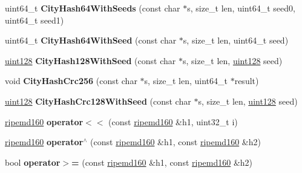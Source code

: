 \begin{DoxyCompactItemize}
\item 
\mbox{\label{namespacefc_a6fb9528abfb48c9a560628178b82c5d3}} 
uint64\+\_\+t {\bfseries City\+Hash64\+With\+Seeds} (const char $\ast$s, size\+\_\+t len, uint64\+\_\+t seed0, uint64\+\_\+t seed1)
\item 
\mbox{\label{namespacefc_a9348344b9161cd90a125089fd3ecbc94}} 
uint64\+\_\+t {\bfseries City\+Hash64\+With\+Seed} (const char $\ast$s, size\+\_\+t len, uint64\+\_\+t seed)
\item 
\mbox{\label{namespacefc_a844e19367a59ec674e83d631cdf4e170}} 
\mbox{\hyperlink{classfc_1_1uint128}{uint128}} {\bfseries City\+Hash128\+With\+Seed} (const char $\ast$s, size\+\_\+t len, \mbox{\hyperlink{classfc_1_1uint128}{uint128}} seed)
\item 
\mbox{\label{namespacefc_a9200b7569059e39ccd3bb854a6184c28}} 
void {\bfseries City\+Hash\+Crc256} (const char $\ast$s, size\+\_\+t len, uint64\+\_\+t $\ast$result)
\item 
\mbox{\label{namespacefc_ab65f763d83f1d03e910979f873c262e2}} 
\mbox{\hyperlink{classfc_1_1uint128}{uint128}} {\bfseries City\+Hash\+Crc128\+With\+Seed} (const char $\ast$s, size\+\_\+t len, \mbox{\hyperlink{classfc_1_1uint128}{uint128}} seed)
\item 
\mbox{\label{namespacefc_a74582b5edb01722eff9ec17ea0ae91f7}} 
\mbox{\hyperlink{classfc_1_1ripemd160}{ripemd160}} {\bfseries operator$<$$<$} (const \mbox{\hyperlink{classfc_1_1ripemd160}{ripemd160}} \&h1, uint32\+\_\+t i)
\item 
\mbox{\label{namespacefc_a72105a082e4d36aec32eabb08f0078c7}} 
\mbox{\hyperlink{classfc_1_1ripemd160}{ripemd160}} {\bfseries operator$^\wedge$} (const \mbox{\hyperlink{classfc_1_1ripemd160}{ripemd160}} \&h1, const \mbox{\hyperlink{classfc_1_1ripemd160}{ripemd160}} \&h2)
\item 
\mbox{\label{namespacefc_a44cb6f8090bfb03c7bb9b7c65b2d2f7c}} 
bool {\bfseries operator$>$=} (const \mbox{\hyperlink{classfc_1_1ripemd160}{ripemd160}} \&h1, const \mbox{\hyperlink{classfc_1_1ripemd160}{ripemd160}} \&h2)
\item 

\end{DoxyCompactItemize}

